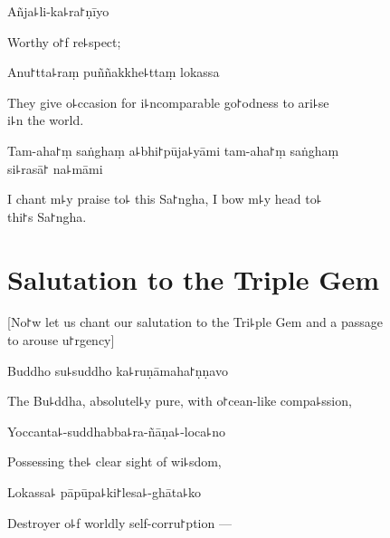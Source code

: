 Añja꜕li-ka꜕ra꜓ṇīyo

\begin{english}
  Worthy o꜓f re꜕spect;
\end{english}

Anu꜓tta꜕raṃ puññakkhe꜕ttaṃ lokassa

\begin{english}
  They give o꜕ccasion for i꜕ncomparable go꜓odness to ari꜕se \\i꜕n the world.
\end{english}

Tam-aha꜓ṃ saṅghaṃ a꜕bhi꜓pūja꜕yāmi tam-aha꜓ṃ saṅghaṃ \\si꜕rasā꜓ na꜕māmi

\begin{english}
  I chant m꜕y praise to꜕ this Sa꜓ngha, I bow m꜕y head to꜕\\ thi꜓s Sa꜓ngha.
\end{english}

\clearpage

\chapter{Salutation to the Triple Gem}              %

\begin{leader}
\end{leader}

\begin{english}
  [No꜓w let us chant our salutation to the Tri꜕ple Gem and a passage \\to arouse u꜓rgency]
\end{english}

%
Buddho su꜕suddho ka꜕ruṇāmaha꜓ṇṇavo

\begin{english}
  The Bu꜕ddha, absolutel꜕y pure, with o꜓cean-like compa꜕ssion,
\end{english}

Yoccanta꜕-suddhabba꜕ra-ñāṇa꜕-loca꜕no

\begin{english}
  Possessing the꜕ clear sight of wi꜕sdom,
\end{english}

Lokassa꜕ pāpūpa꜕ki꜓lesa꜕-ghāta꜕ko

\begin{english}
  Destroyer o꜕f worldly self-corru꜓ption ---
\end{english}

